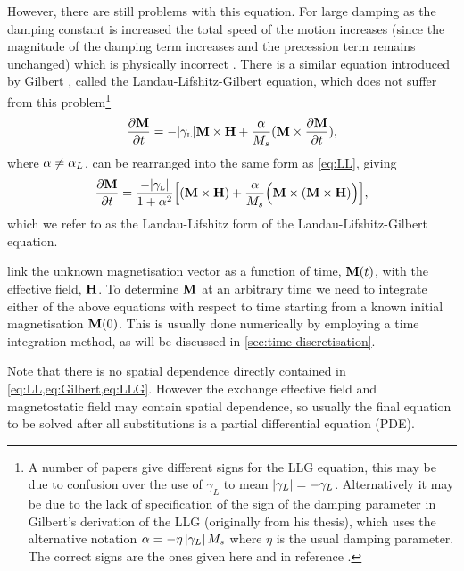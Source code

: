 However, there are still problems with this equation.
For large damping as the damping constant is increased the total speed of the motion increases (since the magnitude of the damping term increases and the precession term remains unchanged) which is physically incorrect \cite{Mallinson1987}.
There is a similar equation introduced by Gilbert \cite{Gilbert2004}, called the Landau-Lifshitz-Gilbert equation, which does not suffer from this problem\footnote{A number of papers give different signs for the LLG equation, this may be due to confusion over the use of $\gamma_L$ to mean $\left|{\gamma_L} \right| = -\gamma_L$. Alternatively it may be due to the lack of specification of the sign of the damping parameter in Gilbert's derivation of the LLG \cite{Gilbert2004} (originally from his thesis), which uses the alternative notation $\alpha = -\eta \left|{\gamma_L} \right| M_s$ where $\eta$ is the usual damping parameter. The correct signs are the ones given here and in reference \cite{Mallinson2000}.}
\begin{equation}
  \label{eq:Gilbert}
  \frac{\partial \mathbf{M}}{\partial t} = - {\left|{\gamma_{\text{\tiny{L}}}} \right|} \mathbf{M} \times \mathbf{H} + \frac{\alpha}{M_s} (\mathbf{M} \times \frac{\partial \mathbf{M}}{\partial t}),
\end{equation}
where $\alpha \neq \alpha_L$.  can be rearranged into the same form as \cref{eq:LL}, giving
\begin{equation}
  \label{eq:LLG}
  \frac{\partial \mathbf{M}}{\partial t} = \frac{-{\left|{\gamma_{\text{\tiny{L}}}} \right|}}{1 + \alpha^2} \Big[ (\mathbf{M} \times \mathbf{H}) + \frac{\alpha}{M_s} \Big(\mathbf{M} \times (\mathbf{M} \times \mathbf{H}) \Big) \Big],
\end{equation}
which we refer to as the Landau-Lifshitz form of the Landau-Lifshitz-Gilbert equation.

 link the unknown magnetisation vector as a function of time, $\mathbf{M}(t)$, with the effective field, $\mathbf{H}$.
To determine $\mathbf{M}$ at an arbitrary time we need to integrate either of the above equations with respect to time starting from a known initial magnetisation $\mathbf{M}(0)$.
This is usually done numerically by employing a time integration method, as will be discussed in \cref{sec:time-discretisation}.

Note that there is no spatial dependence directly contained in \cref{eq:LL,eq:Gilbert,eq:LLG}.
However the exchange effective field and magnetostatic field may contain spatial dependence, so usually the final equation to be solved after all substitutions is a partial differential equation (PDE).



